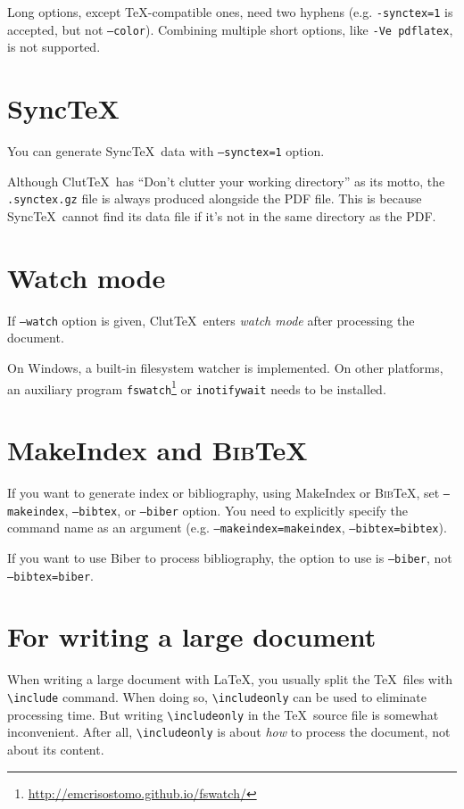 \documentclass[a4paper]{report}
\newcommand\ClutTeX{Clut\TeX}
\providecommand\BibTeX{\textsc{Bib}\TeX}
\newcommand\texcmd[1]{\texttt{\textbackslash #1}}
\begin{document}
Long options, except \TeX-compatible ones, need two hyphens (e.g. \texttt{-synctex=1} is accepted, but not \texttt{--color}).
Combining multiple short options, like \texttt{-Ve pdflatex}, is not supported.

\section{Sync\TeX}\label{sec:synctex}
You can generate Sync\TeX\ data with \texttt{--synctex=1} option.

Although \ClutTeX\ has ``Don't clutter your working directory'' as its motto, the \texttt{.synctex.gz} file is always produced alongside the PDF file.
This is because Sync\TeX\ cannot find its data file if it's not in the same directory as the PDF.

\section{Watch mode}\label{sec:watch-mode}
If \texttt{--watch} option is given, \ClutTeX\ enters \emph{watch mode} after processing the document.

On Windows, a built-in filesystem watcher is implemented.
On other platforms, an auxiliary program \texttt{fswatch}\footnote{\url{http://emcrisostomo.github.io/fswatch/}} or \texttt{inotifywait} needs to be installed.

\section{MakeIndex and \BibTeX}
If you want to generate index or bibliography, using MakeIndex or \BibTeX, set \texttt{--makeindex}, \texttt{--bibtex}, or \texttt{--biber} option.
You need to explicitly specify the command name as an argument (e.g. \texttt{--makeindex=makeindex}, \texttt{--bibtex=bibtex}).

If you want to use Biber to process bibliography, the option to use is \texttt{--biber}, not \texttt{--bibtex=biber}.

\section{For writing a large document}
When writing a large document with \LaTeX, you usually split the \TeX\ files with \texcmd{include} command.
When doing so, \texcmd{includeonly} can be used to eliminate processing time.
But writing \texcmd{includeonly} in the \TeX\ source file is somewhat inconvenient.
After all, \texcmd{includeonly} is about \emph{how} to process the document, not about its content.
\end{document}
